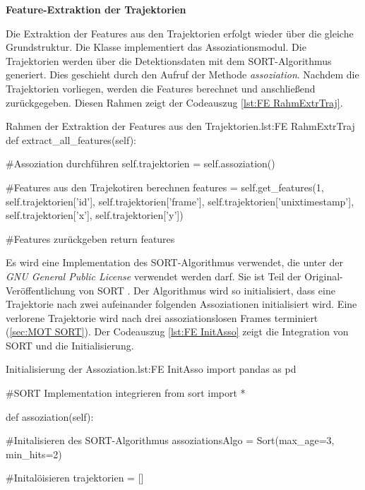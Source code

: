 \dubpar
\textbf{Feature-Extraktion der Trajektorien}\par

Die Extraktion der Features aus den Trajektorien erfolgt wieder über die gleiche Grundstruktur. Die Klasse implementiert das Assoziationsmodul. Die Trajektorien werden über die Detektionsdaten mit dem SORT-Algorithmus generiert. Dies geschieht durch den Aufruf der Methode \textit{assoziation}. Nachdem die Trajektorien vorliegen, werden die Features berechnet und anschließend zurückgegeben. Diesen Rahmen zeigt der Codeauszug \ref{lst:FE RahmExtrTraj}. 

\begin{pythoncode}{Rahmen der Extraktion der Features aus den Trajektorien.}{lst:FE RahmExtrTraj}
def extract_all_features(self):
    
    #Assoziation durchführen
    self.trajektorien = self.assoziation()

    #Features aus den Trajekotiren berechnen
    features = self.get_features(1, self.trajektorien['id'], 
                                    self.trajektorien['frame'], 
                                    self.trajektorien['unixtimestamp'], 
                                    self.trajektorien['x'], 
                                    self.trajektorien['y'])
    
    #Features zurückgeben
    return features
\end{pythoncode}

Es wird eine Implementation des SORT-Algorithmus verwendet, die unter der \textit{GNU General Public License} verwendet werden darf. Sie ist Teil der Original-Veröffentlichung von SORT \cite{Bewley.2016}. Der Algorithmus wird so initialisiert, dass eine Trajektorie nach zwei aufeinander folgenden Assoziationen initialisiert wird. Eine verlorene Trajektorie wird nach drei assoziationslosen Frames terminiert (\autoref{sec:MOT SORT}). Der Codeauszug \ref{lst:FE InitAsso} zeigt die Integration von SORT und die Initialisierung. 

\begin{pythoncode}{Initialisierung der Assoziation.}{lst:FE InitAsso}
import pandas as pd

#SORT Implementation integrieren
from sort import *

def assoziation(self):

    #Initalisieren des SORT-Algorithmus
    assoziationsAlgo = Sort(max_age=3, min_hits=2) 

    #Initalöisieren 
    trajektorien = []

\end{pythoncode}

